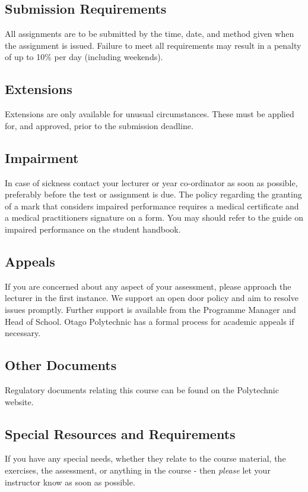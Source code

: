 \documentclass{article}
\begin{document}
\subsection*{Submission Requirements}
All assignments are to be submitted by the time, date, and method given when the assignment is issued.
Failure to meet all requirements may result in a penalty of up to 10\% per day (including
weekends).

\subsection*{Extensions}
Extensions are only available for unusual circumstances.  These must be applied for, and approved, prior to the submission deadline.

\subsection*{Impairment}
In case of sickness contact your lecturer or year co-ordinator as soon as possible, preferably before the test or
assignment is due.  The policy regarding the granting of a mark that considers impaired performance requires a medical
certificate and a medical practitioners signature on a form. You may should refer to the guide on impaired performance
on the student handbook.

\subsection*{Appeals}
If you are concerned about any aspect of your assessment, please approach the lecturer in the first instance.  We support
an open door policy and aim to resolve issues promptly.  Further support is available from the Programme
Manager and Head of School. Otago Polytechnic has a formal process for academic appeals if necessary.

\subsection*{Other Documents}
Regulatory documents relating this course can be found on the Polytechnic website.

\subsection*{Special Resources and Requirements}
If you have any special needs, whether they relate to the course material, the exercises, the assessment, or anything in the course -
then \textit{please} let your instructor know as soon as possible.
\end{document}
